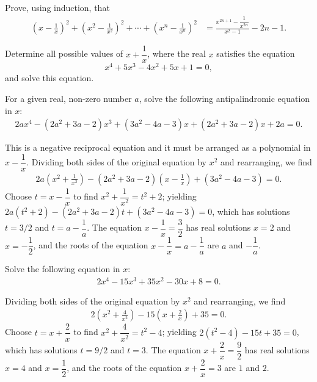 \begin{question}
    Prove, using induction, that
    \begin{align*}
        \left(x-\frac{1}{x}\right)^2 + \left(x^2-\frac{1}{x^2}\right)^2 + \cdots + \left(x^n-\frac{1}{x^n}\right)^2 &= \frac{x^{2n+1}-\dfrac{1}{x^{2n}}}{x^2-1} - 2n-1.
    \end{align*}
\end{question}


\begin{question}[name={2000 Denmark (Georg Mohr)}]
    Determine all possible values of $x+\dfrac{1}{x}$, where the real $x$ satisfies the equation
    \[x^4 + 5x^3 - 4x^2 + 5x + 1 = 0,\] and solve this equation.
\end{question}




\begin{question}
    For a given real, non-zero number $a$, solve the following antipalindromic equation in $x$:
    \begin{align*}
        2ax^4-(2a^2+3a-2)x^3+(3a^2-4a-3)x+(2a^2+3a-2)x+2a=0.
    \end{align*}
\end{question}

\begin{solution}
    This is a negative reciprocal equation and it must be arranged as a polynomial in $x-\dfrac{1}{x}$. Dividing both sides of the original equation by $x^2$ and rearranging, we find 
    \begin{align*}
        2a\left(x^2+\frac{1}{x^2}\right) - (2a^2+3a-2)\left(x-\frac{1}{x}\right) + (3a^2-4a-3)=0.
    \end{align*}
    Choose $t=x-\dfrac{1}{x}$ to find $x^2+\dfrac{1}{x^2}=t^2+2$; yielding $2a(t^2+2)-(2a^2+3a-2)t+(3a^2-4a-3)=0$, which has solutions $t=3/2$ and $t=a-\dfrac{1}{a}$. The equation $x-\dfrac{1}{x}=\dfrac{3}{2}$ has real solutions $x=2$ and $x=-\dfrac{1}{2}$, and the roots of the equation $x-\dfrac{1}{x}=a-\dfrac{1}{a}$ are $a$ and $-\dfrac{1}{a}$. 
\end{solution}


\begin{question}
    Solve the following equation in $x$:
    \begin{align*}
        2x^4-15x^3+35x^2-30x+8=0.
    \end{align*}
\end{question}

\begin{solution}
    Dividing both sides of the original equation by $x^2$ and rearranging, we find 
    \begin{align*}
        2\left(x^2+\frac{4}{x^2}\right) - 15\left(x+\frac{2}{x}\right) + 35=0.
    \end{align*}
    Choose $t=x+\dfrac{2}{x}$ to find $x^2+\dfrac{4}{x^2}=t^2-4$; yielding $2(t^2-4)-15t+35=0$, which has solutions $t=9/2$ and $t=3$. The equation $x+\dfrac{2}{x}=\dfrac{9}{2}$ has real solutions $x=4$ and $x=\dfrac{1}{2}$, and the roots of the equation $x+\dfrac{2}{x}=3$ are $1$ and $2$. 
\end{solution}


